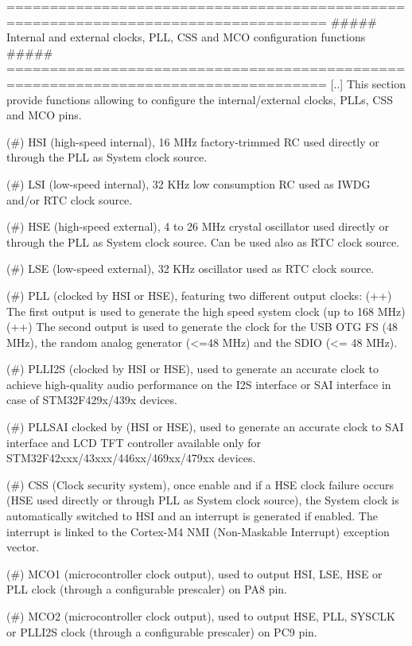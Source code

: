 \begin{DoxyVerb} ===================================================================================
 ##### Internal and  external clocks, PLL, CSS and MCO configuration functions #####
 ===================================================================================
    [..]
      This section provide functions allowing to configure the internal/external clocks,
      PLLs, CSS and MCO pins.
  
      (#) HSI (high-speed internal), 16 MHz factory-trimmed RC used directly or through
          the PLL as System clock source.

      (#) LSI (low-speed internal), 32 KHz low consumption RC used as IWDG and/or RTC
          clock source.

      (#) HSE (high-speed external), 4 to 26 MHz crystal oscillator used directly or
          through the PLL as System clock source. Can be used also as RTC clock source.

      (#) LSE (low-speed external), 32 KHz oscillator used as RTC clock source.   

      (#) PLL (clocked by HSI or HSE), featuring two different output clocks:
        (++) The first output is used to generate the high speed system clock (up to 168 MHz)
        (++) The second output is used to generate the clock for the USB OTG FS (48 MHz),
             the random analog generator (<=48 MHz) and the SDIO (<= 48 MHz).

      (#) PLLI2S (clocked by HSI or HSE), used to generate an accurate clock to achieve 
          high-quality audio performance on the I2S interface or SAI interface in case 
          of STM32F429x/439x devices.
     
      (#) PLLSAI clocked by (HSI or HSE), used to generate an accurate clock to SAI 
          interface and LCD TFT controller available only for STM32F42xxx/43xxx/446xx/469xx/479xx devices.
  
      (#) CSS (Clock security system), once enable and if a HSE clock failure occurs 
         (HSE used directly or through PLL as System clock source), the System clock
         is automatically switched to HSI and an interrupt is generated if enabled. 
         The interrupt is linked to the Cortex-M4 NMI (Non-Maskable Interrupt) 
         exception vector.   

      (#) MCO1 (microcontroller clock output), used to output HSI, LSE, HSE or PLL
          clock (through a configurable prescaler) on PA8 pin.

      (#) MCO2 (microcontroller clock output), used to output HSE, PLL, SYSCLK or PLLI2S
          clock (through a configurable prescaler) on PC9 pin.\end{DoxyVerb}
 

